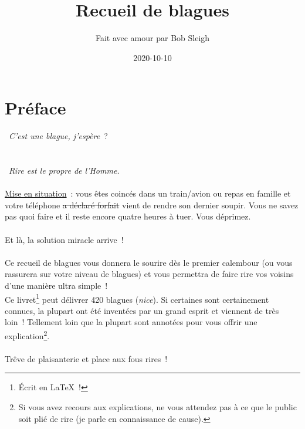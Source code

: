 \documentclass[10pt,a5paper,fullpage]{book}
\author{Fait avec amour par Bob Sleigh}
\title{Recueil de blagues}
\date{2020-10-10}
\begin{document}
	\maketitle
	\tableofcontents
	\newpage
	\section*{Préface}
	\guillemotleft~\textit{C'est une blague, j'espère}~?~\guillemotright\\~ \\ \\
	\guillemotleft~\textit{Rire est le propre de l'Homme.}~\guillemotright\\~ \\
	
	\underline{Mise en situation}~: vous êtes coincés dans un train/avion ou repas en famille et votre téléphone \sout{a déclaré forfait} vient de rendre son dernier soupir. Vous ne savez pas quoi faire et il reste encore quatre heures à tuer. Vous déprimez. \\ \\
	Et là, la solution miracle arrive~! \\ \\
	Ce recueil de blagues vous donnera le sourire dès le premier calembour (ou vous rassurera sur votre niveau de blagues) et vous permettra de faire rire vos voisins d'une manière ultra simple~! \\Ce livret\footnote{Écrit en \LaTeX~!} peut délivrer 420 blagues (\textit{nice}). %
	Si certaines sont certainement connues, la plupart ont été inventées par un grand esprit et viennent de très loin~! Tellement loin que la plupart sont annotées pour vous offrir une explication\footnote{Si vous avez recours aux explications, ne vous attendez pas à ce que le public soit plié de rire (je parle en connaissance de cause).}. \\ \\
	Trêve de plaisanterie et place aux fous rires~!
	
\end{document}
